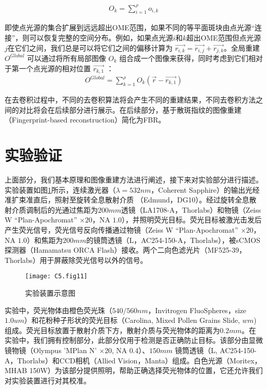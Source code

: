 \begin{equation}
		\begin{aligned}
O_{k} = \sum^{\rho}_{i=1}
o_{i,k}
\label{eq:5.5}
\end{aligned}
\end{equation}

即使点光源的集合扩展到远远超出OME范围，如果不同的等平面斑块由点光源“连接”，则可以恢复完整的空间分布。例如，如果点光源$i$和$k$超出OME范围但点光源$j$在它们之间，我们总是可以将它们之间的偏移计算为 $\vec{r_{i,k}} = \vec {r_{i,j}} + \vec{r_{j,k}}$。全局重建 $O^{Global}$ 可以通过将所有局部图像 $O_{k}$ 组合成一个图像来获得，同时考虑到它们相对于第一个点光源的相对位置 $\vec{r_{k,1}}$ ：
\begin{equation}
	\begin{aligned}
O^{Global} = \sum^{\rho}_{k=1}
O_{k}(\vec{r} - \vec{r_{k,1}})
\label{eq:5.6}
\end{aligned}
\end{equation}

在去卷积过程中，不同的去卷积算法将会产生不同的重建结果，不同去卷积方法之间的对比将会在后续部分进行展示。在后续部分，基于散斑指纹的图像重建（Fingerprint-based reconstruction）简化为FBR。

\section{实验验证}

上面部分，我们基本原理和图像重建方法进行阐述，接下来对实验部分进行描述。实验装置如图\ref{fig:5.11}所示，连续激光器（$\lambda  = 532 nm $，Coherent Sapphire）的输出光经准扩束准直后，照射至旋转全息散射介质 （Edmund，DG10）。经过旋转全息散射介质调制后的光通过焦距为$200 mm$透镜（LA1708-A，Thorlabs）和物镜（Zeiss W “Plan-Apochromat” $\times 20$，NA $1.0$），并照明荧光目标。荧光目标被激光击发后产生荧光信号，荧光信号反向传播通过物镜（Zeiss W “Plan-Apochromat” $\times 20$，NA $1.0$）和焦距为$200 mm$的镜筒透镜（L，AC254-150-A，Thorlabs），被sCMOS探测器（Hamamatsu ORCA Flash）接收。两个二向色滤光片（MF525-39，Thorlabs）用于屏蔽除荧光信号以外的信号。

\begin{figure}[htp]
	\centering
	\texttt{[image: C5.fig11]}
	\caption{实验装置示意图}
	\label{fig:5.11}
\end{figure}

实验中，荧光物体由橙色荧光珠（$540/560 nm$，Invitrogen FluoSpheres，size $1.0 um$）和花粉种子形状的荧光目标（Carolina, Mixed Pollen Grains Slide, $wm$)组成。荧光目标放置于散射介质下方，散射介质与荧光物体的距离为$0.2 mm$。在实验中，我们拥有控制部分，此部分仅用于检测是否正确防止目标。该部分由显微镜物镜（Olympus 'MPlan N' $\times 20$, NA $0.4$）、$ 150 mm$ 镜筒透镜（L, AC254-150-A，Thorlabs）和CCD相机（Allied Vision，Manta）组成。白色光源（Moritex，MHAB 150W）为该部分提供照明，帮助正确选择荧光物体的位置，它还允许我们对实验装置进行对其校准。
